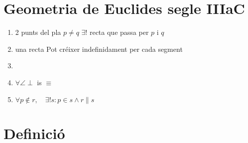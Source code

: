 \documentclass[a4paper,10pt]{article}
\newcommand{\red}[1]{{\color{red}#1}}
\begin{document}
\tableofcontents\newpage
\part{Geometria de Euclides segle IIIaC}
\begin{enumerate}
\item 2 punts del pla
	\subitem $p \neq q$
	\subitem $\exists !$ recta que passa per $p$ i $q$
\item una recta
	\subitem Pot créixer indefinidament per cada segment
\item \phantom{Doncs no ho ha dit res}
\item $\forall \angle \perp$ is $\equiv$
\item $\forall p \notin r, \quad \exists ! s: p \in s \wedge r \parallel s$
\end{enumerate}

\part{\red{D}efinició}
\end{document}
